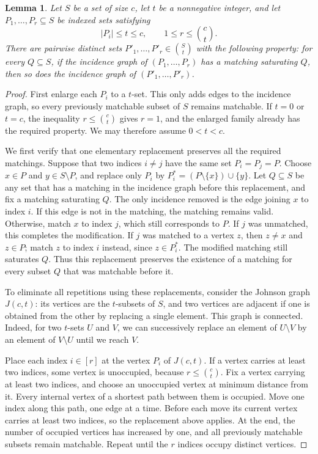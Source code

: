 \documentclass[10pt,a4paper]{article}
\numberwithin{equation}{section}
\newtheorem{lemma}[theorem]{Lemma}
\theoremstyle{definition}
\theoremstyle{plain}
\begin{document}
\begin{lemma}\label{lem:distinct}
Let $S$ be a set of size $c$, let $t$ be a nonnegative integer, and
let $P_1,\ldots,P_r\subseteq S$ be indexed sets satisfying
\[
 |P_i|\le t\le c,\qquad 1\le r\le\binom ct.
\]
There are pairwise distinct sets $P'_1,\ldots,P'_r\in\binom St$ with
the following property: for every $Q\subseteq S$, if the incidence graph
of $(P_1,\ldots,P_r)$ has a matching saturating $Q$, then so does the
incidence graph of $(P'_1,\ldots,P'_r)$.
\end{lemma}


\begin{proof}
First enlarge each $P_i$ to a $t$-set. This only adds edges to the
incidence graph, so every previously matchable subset of $S$ remains
matchable. If $t=0$ or $t=c$, the inequality $r\le\binom ct$ gives
$r=1$, and the enlarged family already has the required property.
We may therefore assume $0<t<c$.

We first verify that one elementary replacement preserves all the
required matchings. Suppose that two indices $i\ne j$ have the same
set $P_i=P_j=P$. Choose $x\in P$ and $y\in S\setminus P$, and replace
only $P_i$ by
\(
 P_i^*=(P\setminus\{x\})\cup\{y\}.
\)
Let $Q\subseteq S$ be any set that has a matching in the incidence
graph before this replacement, and fix a matching saturating $Q$.
The only incidence removed is the edge joining $x$ to index $i$.
If this edge is not in the matching, the matching remains valid.
Otherwise, match $x$ to index $j$, which still corresponds to $P$.
If $j$ was unmatched, this completes the modification. If $j$ was
matched to a vertex $z$, then $z\ne x$ and $z\in P$; match $z$ to
index $i$ instead, since $z\in P_i^*$. The modified matching still
saturates $Q$. Thus this replacement preserves the existence of a
matching for every subset $Q$ that was matchable before it.

To eliminate all repetitions using these replacements, consider the
Johnson graph $J(c,t)$: its vertices are the $t$-subsets of $S$, and
two vertices are adjacent if one is obtained from the other by
replacing a single element. This graph is connected. Indeed, for
two $t$-sets $U$ and $V$, we can successively replace an element of
$U\setminus V$ by an element of $V\setminus U$ until we reach $V$.

Place each index $i\in[r]$ at the vertex $P_i$ of $J(c,t)$. If a vertex
carries at least two indices, some vertex is unoccupied, because
$r\le\binom ct$. Fix a vertex carrying at least two indices, and choose
an unoccupied vertex at minimum distance from it. Every internal
vertex of a shortest path between them is occupied. Move one index
along this path, one edge at a time. Before each move its current
vertex carries at least two indices, so the replacement above applies.
At the end, the number of occupied vertices has increased by one,
and all previously matchable subsets remain matchable. Repeat until
the $r$ indices occupy distinct vertices.
\end{proof}
\end{document}
